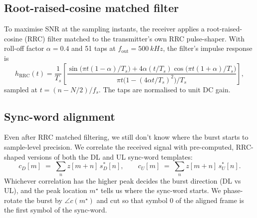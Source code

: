 \documentclass[11pt,a4paper]{article}
\begin{document}
\subsection{Root-raised-cosine matched filter}

To maximise SNR at the sampling instants, the receiver applies a
root-raised-cosine (RRC) filter matched to the transmitter's own RRC
pulse-shaper. With roll-off factor $\alpha = 0.4$ and 51 taps at
$f_\text{out} = \SI{500}{kHz}$, the filter's impulse response is
\begin{equation}
h_\text{RRC}(t) = \frac{1}{T_s}\left[
   \frac{\sin\bigl(\pi t (1-\alpha) / T_s\bigr) + 4\alpha (t/T_s)
         \cos\bigl(\pi t (1+\alpha)/T_s\bigr)}
        {\pi t \bigl(1 - (4\alpha t / T_s)^2\bigr) / T_s}
\right],
\end{equation}
sampled at $t = (n - N/2) / f_s$. The taps are normalised to unit DC gain.

\begin{center}
\end{center}

\subsection{Sync-word alignment}

Even after RRC matched filtering, we still don't know where the burst
starts to sample-level precision. We correlate the received signal with
pre-computed, RRC-shaped versions of both the DL and UL sync-word
templates:
\begin{equation}
c_D[m] \;=\; \sum_{n} z[m+n]\, s_D^\ast[n], \qquad
c_U[m] \;=\; \sum_{n} z[m+n]\, s_U^\ast[n].
\end{equation}
Whichever correlation has the higher peak decides the burst direction
(DL vs UL), and the peak location $m^\star$ tells us where the sync-word
starts. We phase-rotate the burst by $\angle c(m^\star)$ and cut so that
symbol 0 of the aligned frame is the first symbol of the sync-word.
\end{document}
